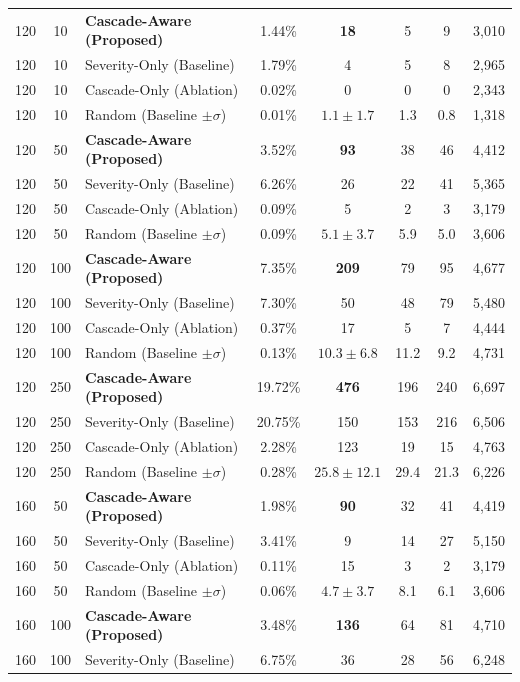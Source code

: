 \begin{table}[h!]
\begin{tabular}{|c|c|l|c|c|c|c|c|}
\hline
\hline
120 & 10 & \textbf{Cascade-Aware (Proposed)} & 1.44\% & \textbf{18} & 5 & 9 & 3,010 \\
120 & 10 & Severity-Only (Baseline) & 1.79\% & 4 & 5 & 8 & 2,965 \\
120 & 10 & Cascade-Only (Ablation) & 0.02\% & 0 & 0 & 0 & 2,343 \\
120 & 10 & Random (Baseline $\pm \sigma$) & 0.01\% & $1.1 \pm 1.7$ & 1.3 & 0.8 & 1,318 \\
\hline
120 & 50 & \textbf{Cascade-Aware (Proposed)} & 3.52\% & \textbf{93} & 38 & 46 & 4,412 \\
120 & 50 & Severity-Only (Baseline) & 6.26\% & 26 & 22 & 41 & 5,365 \\
120 & 50 & Cascade-Only (Ablation) & 0.09\% & 5 & 2 & 3 & 3,179 \\
120 & 50 & Random (Baseline $\pm \sigma$) & 0.09\% & $5.1 \pm 3.7$ & 5.9 & 5.0 & 3,606 \\
\hline
120 & 100 & \textbf{Cascade-Aware (Proposed)} & 7.35\% & \textbf{209} & 79 & 95 & 4,677 \\
120 & 100 & Severity-Only (Baseline) & 7.30\% & 50 & 48 & 79 & 5,480 \\
120 & 100 & Cascade-Only (Ablation) & 0.37\% & 17 & 5 & 7 & 4,444 \\
120 & 100 & Random (Baseline $\pm \sigma$) & 0.13\% & $10.3 \pm 6.8$ & 11.2 & 9.2 & 4,731 \\
\hline
120 & 250 & \textbf{Cascade-Aware (Proposed)} & 19.72\% & \textbf{476} & 196 & 240 & 6,697 \\
120 & 250 & Severity-Only (Baseline) & 20.75\% & 150 & 153 & 216 & 6,506 \\
120 & 250 & Cascade-Only (Ablation) & 2.28\% & 123 & 19 & 15 & 4,763 \\
120 & 250 & Random (Baseline $\pm \sigma$) & 0.28\% & $25.8 \pm 12.1$ & 29.4 & 21.3 & 6,226 \\
\hline
\hline
160 & 50 & \textbf{Cascade-Aware (Proposed)} & 1.98\% & \textbf{90} & 32 & 41 & 4,419 \\
160 & 50 & Severity-Only (Baseline) & 3.41\% & 9 & 14 & 27 & 5,150 \\
160 & 50 & Cascade-Only (Ablation) & 0.11\% & 15 & 3 & 2 & 3,179 \\
160 & 50 & Random (Baseline $\pm \sigma$) & 0.06\% & $4.7 \pm 3.7$ & 8.1 & 6.1 & 3,606 \\
\hline
160 & 100 & \textbf{Cascade-Aware (Proposed)} & 3.48\% & \textbf{136} & 64 & 81 & 4,710 \\
160 & 100 & Severity-Only (Baseline) & 6.75\% & 36 & 28 & 56 & 6,248 \\

\end{tabular}
\end{table}
